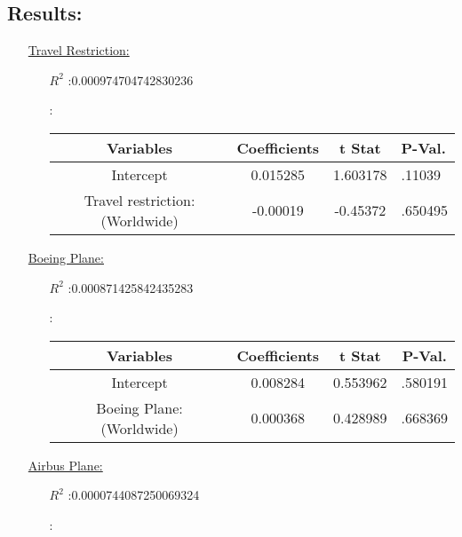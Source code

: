 \documentclass[12pt]{report}
\begin{document}
\subsection*{Results:}
\begin{enumerate}
    \item[\underline{Travel Restriction:}]
        \begin{enumerate}
            \item[$R^2$]:0.000974704742830236
            \item[]:


                \begin{tabular}{|c|c|c|}
                    \toprule\hline
                    \textbf{Variables} & \textbf{Coefficients} & \textbf{t Stat}& \textbf{P-Val.} \\ \hline
                    Intercept & 0.015285 & 1.603178&.11039 \\ \hline
                    Travel restriction:(Worldwide) & -0.00019 & -0.45372 &.650495\\ \hline
                    \bottomrule
                \end{tabular}





        \end{enumerate}
    \item[\underline{Boeing Plane:}]
        \begin{enumerate}
            \item[$R^2$]:0.000871425842435283
            \item[]:

                \begin{tabular}{|c|c|c|c|}
                    \toprule \hline

                    \textbf{Variables} & \textbf{Coefficients} & \textbf{t Stat}& \textbf{P-Val.} \\ \hline

                    Intercept & 0.008284 & 0.553962 &.580191 \\ \hline
                    Boeing Plane: (Worldwide) & 0.000368 & 0.428989 &.668369  \\ \hline
                    \bottomrule
                \end{tabular}





        \end{enumerate}
    \item[\underline{Airbus Plane:}]
        \begin{enumerate}
            \item[$R^2$]:0.0000744087250069324
            \item[]:



\end{enumerate}
\end{enumerate}
\end{document}
